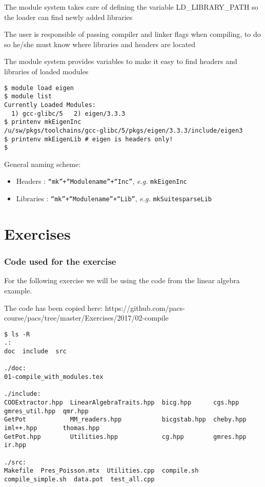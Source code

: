 \documentclass[9pt]{beamer}
\begin{document}
\begin{frame}[fragile]

The module system takes care of defining the variable LD\_LIBRARY\_PATH so the loader can find newly added libraries

The user is responsible of passing compiler and linker flags when compiling, to do so he/she must know where libraries and headers are located

The module system provides variables to make it easy to find headers and libraries of loaded modules

\begin{verbatim}
$ module load eigen
$ module list
Currently Loaded Modules:
  1) gcc-glibc/5   2) eigen/3.3.3
$ printenv mkEigenInc
/u/sw/pkgs/toolchains/gcc-glibc/5/pkgs/eigen/3.3.3/include/eigen3
$ printenv mkEigenLib # eigen is headers only!
$ 
\end{verbatim}

General naming scheme: 
\begin{itemize}
\item Headers : {\tt ``mk''+``Modulename''+``Inc''}, {\it e.g.} {\tt mkEigenInc}
\item Libraries : {\tt ``mk''+``Modulename''+``Lib''}, {\it e.g.} {\tt mkSuitesparseLib}
\end{itemize}
\end{frame}

\section{Exercises}
\begin{frame}[fragile]
\frametitle{Code used for the exercise}

For the following exercise we will be using the code from the linear algebra example.

The code has been copied here: https://github.com/pacs-course/pacs/tree/master/Exercises/2017/02-compile

\tiny
\begin{verbatim}
$ ls -R
.:
doc  include  src

./doc:
01-compile_with_modules.tex

./include:
COOExtractor.hpp  LinearAlgebraTraits.hpp  bicg.hpp      cgs.hpp    gmres_util.hpp  qmr.hpp
GetPot            MM_readers.hpp           bicgstab.hpp  cheby.hpp  iml++.hpp       thomas.hpp
GetPot.hpp        Utilities.hpp            cg.hpp        gmres.hpp  ir.hpp

./src:
Makefile  Pres_Poisson.mtx  Utilities.cpp  compile.sh  compile_simple.sh  data.pot  test_all.cpp
\end{verbatim}

\end{frame}
\end{document}
